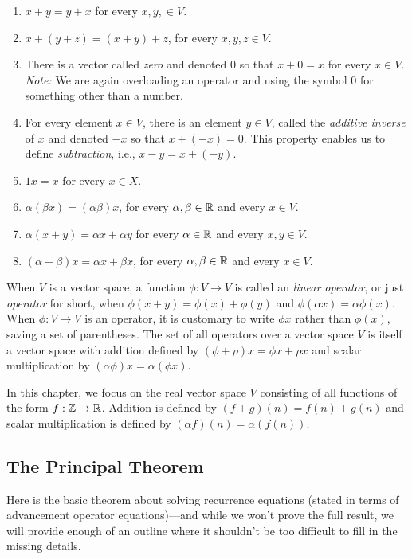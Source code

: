 \begin{enumerate}
\item  $x+y=y+x$ for every $x,y,\in V$.
\item  $x+(y+z) = (x+y)+z$, for every $x,y,z\in V$.
\item There is a vector called \textit{zero} and denoted $0$ so that
  $x+0=x$ for every $x\in V$. \textit{Note:} We are again overloading
  an operator and using the symbol $0$ for something other than a
  number.
\item For every element $x\in V$, there is an element $y\in V$, called
  the \textit{additive inverse} of $x$ and denoted $-x$ so that
  $x+(-x)=0$.  This property enables us to define
  \textit{subtraction}, i.e., $x-y= x+(-y)$.
\item $1x=x$ for every $x\in X$.
\item $\alpha(\beta x) = (\alpha\beta)x$, for every
  $\alpha,\beta\in\mathbb{R}$ and every $x\in V$.
\item $\alpha(x+y)=\alpha x + \alpha y$ for every $\alpha\in\mathbb{R}$
  and every $x,y\in V$.
\item $(\alpha +\beta) x = \alpha x + \beta x$, for every
  $\alpha,\beta\in\mathbb{R}$ and every $x\in V$.
\end{enumerate}

When $V$ is a vector space, a function $\phi:V\rightarrow V$ is called
an \textit{linear operator}, or just \textit{operator} for short, when
$\phi(x+y)=\phi(x)+\phi(y)$ and $\phi(\alpha x)=\alpha\phi(x)$.  When
$\phi:V\rightarrow V$ is an operator, it is customary to write $\phi
x$ rather than $\phi(x)$, saving a set of parentheses.  The set of all
operators over a vector space $V$ is itself a vector space with
addition defined by $(\phi+\rho)x = \phi x +\rho x$ and scalar
multiplication by $(\alpha\phi)x=\alpha(\phi x)$.

In this chapter, we focus on the real vector space $V$ consisting of
all functions of the form $f:\mathbb{Z}\rightarrow\mathbb{R}$.  Addition is
defined by $(f+g)(n)= f(n)+g(n)$ and scalar multiplication is defined
by $(\alpha f)(n)=\alpha(f(n))$.

\subsection{The Principal Theorem}\label{s:recurrence:rigorous:principal}
Here is the basic theorem about solving recurrence equations (stated
in terms of advancement operator equations)---and while we won't prove
the full result, we will provide enough of an outline where it
shouldn't be too difficult to fill in the missing details.

